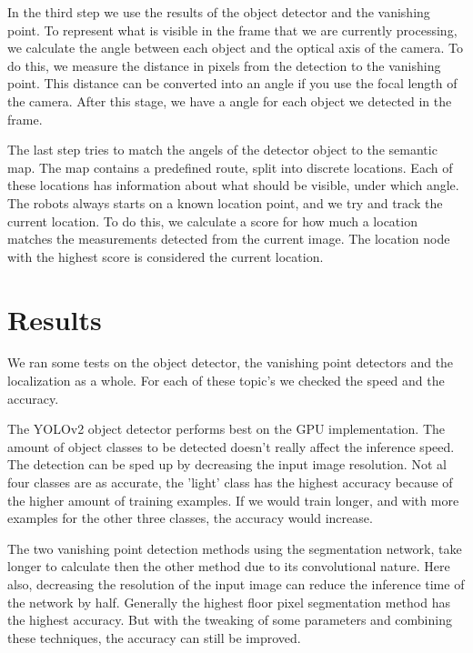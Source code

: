 In the third step we use the results of the object detector and the vanishing point.
To represent what is visible in the frame that we are currently processing, we calculate the angle between each object and the optical axis of the camera.
To do this, we measure the distance in pixels from the detection to the vanishing point.
This distance can be converted into an angle if you use the focal length of the camera.
After this stage, we have a angle for each object we detected in the frame.

The last step tries to match the angels of the detector object to the semantic map.
The map contains a predefined route, split into discrete locations.
Each of these locations has information about what should be visible, under which angle.
The robots always starts on a known location point, and we try and track the current location.
To do this, we calculate a score for how much a location matches the measurements detected from the current image.
The location node with the highest score is considered the current location.

\section*{Results}
We ran some tests on the object detector, the vanishing point detectors and the localization as a whole.
For each of these topic's we checked the speed and the accuracy.

The YOLOv2 object detector performs best on the GPU implementation.
The amount of object classes to be detected doesn't really affect the inference speed.
The detection can be sped up by decreasing the input image resolution.
Not al four classes are as accurate, the 'light' class has the highest accuracy because of the higher amount of training examples.
If we would train longer, and with more examples for the other three classes, the accuracy would increase.

The two vanishing point detection methods using the segmentation network, take longer to calculate then the other method due to its convolutional nature.
Here also, decreasing the resolution of the input image can reduce the inference time of the network by half.
Generally the highest floor pixel segmentation method has the highest accuracy.
But with the tweaking of some parameters and combining these techniques, the accuracy can still be improved.

